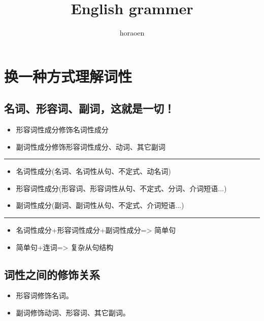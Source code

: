 \documentclass{ctexart}
\title{English grammer}
\author{horaoen}
\begin{document}
  \maketitle
  \section{换一种方式理解词性}
  \subsection{名词、形容词、副词，这就是一切！}
  \begin{itemize}
    \item 形容词性成分修饰名词性成分
    \item 副词性成分修饰形容词性成分、动词、其它副词
  \end{itemize}

  \hrule
  \begin{itemize}
    \item 名词性成分(名词、名词性从句、不定式、动名词)
    \item 形容词性成分(形容词、形容词性从句、不定式、分词、介词短语...)
    \item 副词性成分(副词、副词性从句、不定式、介词短语...)
  \end{itemize}

  \hrule
  \begin{itemize}
    \item 名词性成分+形容词性成分+副词性成分=> 简单句
    \item 简单句+连词=> 复杂从句结构
  \end{itemize}
  \subsection{词性之间的修饰关系}
  \begin{itemize}
    \item 形容词修饰名词。
    \item 副词修饰动词、形容词、其它副词。
  \end{itemize}
\end{document}
